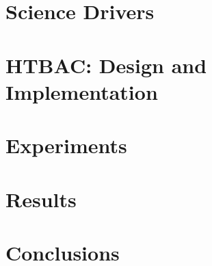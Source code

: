 \documentclass{llncs}
\begin{document}
\section{Science Drivers}
\label{sec:science-drivers}



\section{HTBAC: Design and Implementation}


\section{Experiments}


\section{Results}


\section{Conclusions}
%


\newpage



\end{document}
